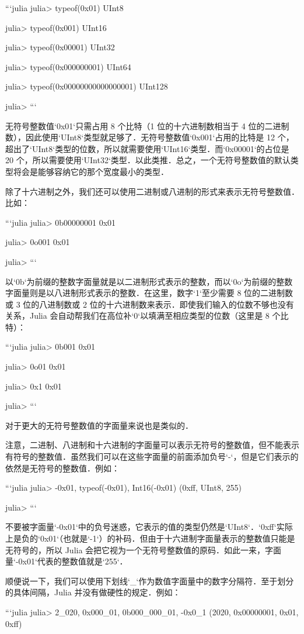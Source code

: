 ```julia
julia> typeof(0x01)
UInt8

julia> typeof(0x001)
UInt16

julia> typeof(0x00001)
UInt32

julia> typeof(0x000000001)
UInt64

julia> typeof(0x00000000000000001)
UInt128

julia> 
```

无符号整数值`0x01`只需占用 8 个比特（1 位的十六进制数相当于 4 位的二进制数），因此使用`UInt8`类型就足够了．无符号整数值`0x001`占用的比特是 12 个，超出了`UInt8`类型的位数，所以就需要使用`UInt16`类型．而`0x00001`的占位是 20 个，所以需要使用`UInt32`类型．以此类推．总之，一个无符号整数值的默认类型将会是能够容纳它的那个宽度最小的类型．

除了十六进制之外，我们还可以使用二进制或八进制的形式来表示无符号整数值．比如：

```julia
julia> 0b00000001
0x01

julia> 0o001
0x01

julia> 
```

以`0b`为前缀的整数字面量就是以二进制形式表示的整数，而以`0o`为前缀的整数字面量则是以八进制形式表示的整数．在这里，数字`1`至少需要 8 位的二进制数或 3 位的八进制数或 2 位的十六进制数来表示．即使我们输入的位数不够也没有关系，Julia 会自动帮我们在高位补`0`以填满至相应类型的位数（这里是 8 个比特）：

```julia
julia> 0b001
0x01

julia> 0o01
0x01

julia> 0x1
0x01

julia>
```

对于更大的无符号整数值的字面量来说也是类似的．

注意，二进制、八进制和十六进制的字面量可以表示无符号的整数值，但不能表示有符号的整数值．虽然我们可以在这些字面量的前面添加负号`-`，但是它们表示的依然是无符号的整数值．例如：

```julia
julia> -0x01, typeof(-0x01), Int16(-0x01)
(0xff, UInt8, 255)

julia> 
```

不要被字面量`-0x01`中的负号迷惑，它表示的值的类型仍然是`UInt8`．`0xff`实际上是负的`0x01`（也就是`-1`）的补码．但由于十六进制字面量表示的整数值只能是无符号的，所以 Julia 会把它视为一个无符号整数值的原码．如此一来，字面量`-0x01`代表的整数值就是`255`．

顺便说一下，我们可以使用下划线`_`作为数值字面量中的数字分隔符．至于划分的具体间隔，Julia 并没有做硬性的规定．例如：

```julia
julia> 2_020, 0x000_01, 0b000_000_01, -0x0_1
(2020, 0x00000001, 0x01, 0xff)

